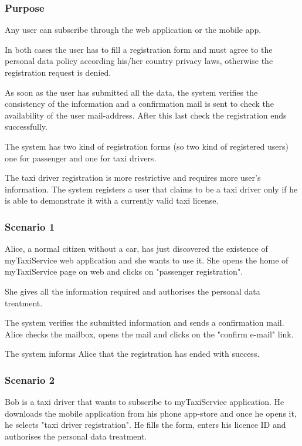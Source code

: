 \label{user-registration}
\subsubsection{Purpose}
Any user can subscribe through the web application or the mobile app.

In both cases the user has to fill a registration form and must agree to the personal data policy according his/her country privacy laws, otherwise the registration request is denied.

As soon as the user has submitted all the data, the system verifies the consistency of the information and a confirmation mail is sent to check the availability of the user mail-address.  After this last check the registration ends successfully.

The system has two kind of registration forms (so two kind of registered users) one for passenger and one for taxi drivers.

The taxi driver registration is more restrictive and requires more user's information.
The system registers a user that claims to be a taxi driver only if he is able to demonstrate it with a currently valid taxi license.

\subsubsection{Scenario 1}
Alice, a normal citizen without a car, has just discovered the existence of myTaxiService web application and she wants to use it.
She opens the home of myTaxiService page on web and clicks on "passenger registration".

She gives all the information required and authorises the personal data treatment.

The system verifies the submitted information and sends a confirmation mail.
Alice checks the mailbox, opens the mail and clicks on the "confirm e-mail" link.

The system informs Alice that the registration has ended with success.

\subsubsection{Scenario 2}
Bob is a taxi driver that wants to subscribe to myTaxiService application.
He downloads the mobile application from his phone app-store and once he opens it, he selects "taxi driver registration".
He fills the form, enters his licence ID and authorises the personal data treatment.

